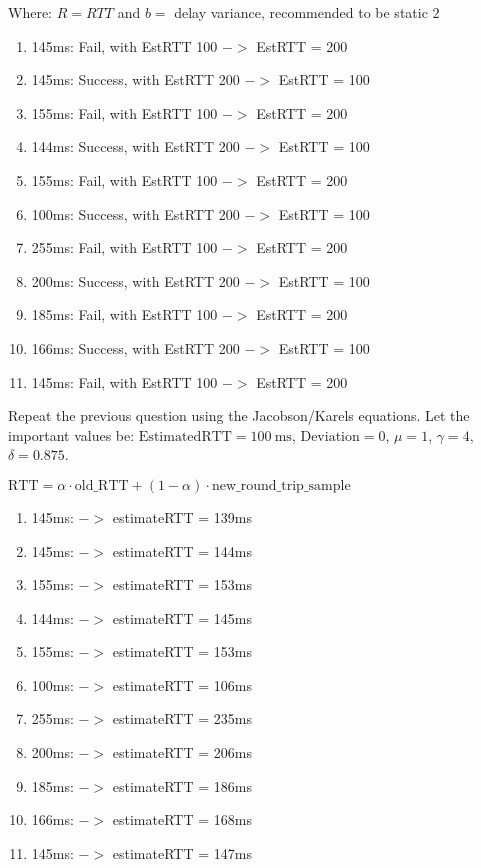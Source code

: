 \documentclass[12pt,addpoints,answers]{exam}
\begin{document}
\begin{questions}
\begin{solution}
	Where: $ R = RTT$ and $b =$ delay variance, recommended to be static $2$
	\begin{enumerate}
		\item 145ms:  Fail, with EstRTT 100 $ -> $ EstRTT = 200
		\item 145ms:  Success, with EstRTT 200 $ -> $ EstRTT = 100
		\item 155ms:  Fail, with EstRTT 100 $ -> $ EstRTT = 200
		\item 144ms:  Success, with EstRTT 200 $ -> $ EstRTT = 100
		\item 155ms:  Fail, with EstRTT 100 $ -> $ EstRTT = 200
		\item 100ms:  Success, with EstRTT 200 $ -> $ EstRTT = 100
		\item 255ms:  Fail, with EstRTT 100 $ -> $ EstRTT = 200
		\item 200ms:  Success, with EstRTT 200 $ -> $ EstRTT = 100
 		\item 185ms:  Fail, with EstRTT 100 $ -> $ EstRTT = 200
 		\item 166ms:  Success, with EstRTT 200 $ -> $ EstRTT = 100
		\item 145ms:  Fail, with EstRTT 100 $ -> $ EstRTT = 200
	\end{enumerate}
\end{solution}

\question[10] Repeat the previous question using the Jacobson/Karels equations. Let the important values be: $\mathrm{EstimatedRTT} = \SI{100}{\milli\second}$, $\mathrm{Deviation} = 0$, $\mu = 1$, $\gamma = 4$, $\delta = 0.875$.
\begin{solution}
	\begin{center}
		${\displaystyle \mathrm {RTT} =\alpha \cdot \mathrm {old\_RTT} +(1-\alpha )\cdot \mathrm {new\_round\_trip\_sample} }$
	\end{center}
	
	\begin{enumerate}
		\item 145ms:   $->$ estimateRTT = 139ms
		\item 145ms:   $->$ estimateRTT = 144ms
		\item 155ms:   $->$ estimateRTT = 153ms
		\item 144ms:   $->$ estimateRTT = 145ms
		\item 155ms:   $->$ estimateRTT = 153ms
		\item 100ms:   $->$ estimateRTT = 106ms
		\item 255ms:   $->$ estimateRTT = 235ms
		\item 200ms:   $->$ estimateRTT = 206ms
		\item 185ms:   $->$ estimateRTT = 186ms
		\item 166ms:   $->$ estimateRTT = 168ms
		\item 145ms:   $->$ estimateRTT = 147ms
	\end{enumerate}
	
\end{solution}

\end{questions}
\end{document}
